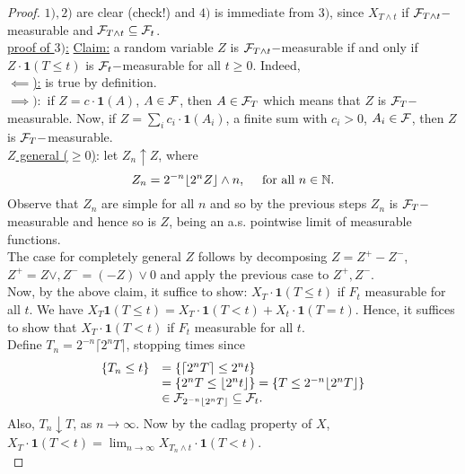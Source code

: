 \documentclass{article}
\begin{document}
\begin{proof}
    $ 1), 2)$ are clear (check!) and $ 4)$ is immediate from $ 3)$, since $ X_{T\land t}$ if $ \mathcal{F}_{T\land t}-$measurable and $\mathcal{F}_{T\land t} \subseteq \mathcal{F}_{t}$.\\ 

\underline{proof of $ 3)$:} \underline{Claim:} a random variable $ Z$ is $ \mathcal{F}_{T\land t}-$measurable if and only if $ Z\cdot \mathbf{1}(T\leq t)$ is $ \mathcal{F}_{t}-$measurable for all $ t\geq 0$. Indeed, \\ 

\underline{$ \impliedby$):} is true by definition. \\ 

\underline{$ \implies):$} if $ Z = c\cdot \mathbf{1}(A)$, $ A\in \mathcal{F}$, then $ A\in \mathcal{F}_{T}$ which means that $ Z$ is $ \mathcal{F}_{T}-$measurable. Now, if $ Z =\displaystyle\sum_{i}c_{i}\cdot \mathbf{1}(A_{i}) $, a finite sum with $ c_{i}>0$, $ A_{i}\in \mathcal{F}$, then $ Z$ is $ \mathcal{F}_{T}-$measurable.\\ 

\underline{$ Z$ general ($ \geq 0$)}: let $ Z_{n}\uparrow Z$, where 
\[
	Z_{n} = 2^{-n}\lfloor 2^n Z\rfloor \land n, \quad \text{ for all } n \in \mathbb{N}.
\]
Observe that $ Z_{n}$ are simple for all $ n$ and so by the previous steps $ Z_{n}$ is $ \mathcal{F}_{T}-$measurable and hence so is $ Z$, being an a.s. pointwise limit of measurable functions.\\ 

The case for completely general $ Z$ follows by decomposing $ Z = Z^{+}-Z^{-}$, $ Z^{+} = Z \lor, Z^{-} = (-Z)\lor 0$ and apply the previous case to $ Z^{+}, Z^{-}$.\\ 

Now, by the above claim, it suffice to show: $ X_{T}\cdot \mathbf{1}(T\leq t)$ if $ F_{t}$ measurable for all $ t$. We have $ X_{T} \mathbf{1}(T\leq t) = X_{T}\cdot \mathbf{1}(T<t)+X_{t}\cdot \mathbf{1}(T=t)$. Hence, it suffices to show  that  $ X_{T}\cdot \mathbf{1}(T< t)$ if $ F_{t}$ measurable for all $ t$.\\ 

Define $ T_{n} = 2^{-n}\lceil 2^n T \rceil $, stopping times since 
\[
\begin{array}{ll}
	\{T_{n}\leq t\} &= \{\lceil 2^n T\rceil \leq 2^n t\} \\
			&= \{2^n T\leq \lfloor 2^n t\rfloor\} = \{T\leq 2^{-n}\lfloor 2^n T\rfloor\}\\ 
			&\in \mathcal{F}_{2^{-n}\lfloor 2^n T\rfloor}\subseteq \mathcal{F}_{t}.
\end{array}
\]
Also, $ T_{n}\downarrow T$, as $ n\to \infty$. Now by the cadlag property of $ X$,\\ 
$ X_{T}\cdot \mathbf{1}(T<t) = \lim_{n \to \infty} X_{T_{n}\land t}\cdot \mathbf{1}(T<t)$.\\ 


\end{proof}
\end{document}
